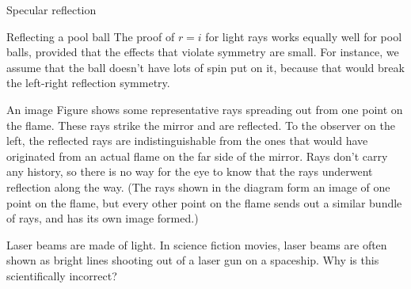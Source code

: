 \begin{envsubsection}{Specular reflection}
\begin{eg}{Reflecting a pool ball}\label{eg:reflectpoolball}
The proof of $r=i$ for light rays works equally well for pool balls, provided that
the effects that violate symmetry are small. For instance, we assume that the ball
doesn't have lots of spin put on it, because that would break the left-right
reflection symmetry.
\end{eg}
\begin{eg}{An image}\label{eg:flatmirrorimage}
Figure  shows some representative rays spreading out 
from one point on the flame. These rays strike the mirror and are reflected. To the observer on
the left, the reflected rays are indistinguishable from the ones that would have originated from
an actual flame on the far side of the mirror. Rays don't carry any history, so there is no
way for the eye to know that the rays underwent reflection along the way. (The rays shown in the diagram
form an image of one point on the flame, but every other point on the flame sends out a similar
bundle of rays, and has its own image formed.)
\end{eg}
\end{envsubsection}

\dqheader
\begin{dq}
Laser beams are made of light. In science fiction movies, laser beams are often shown
as bright lines shooting out of a laser gun on a spaceship. Why is this scientifically
incorrect?
\end{dq}


